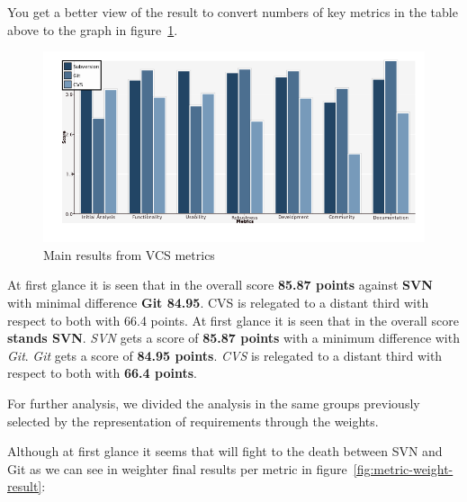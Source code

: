 \documentclass[11pt]{scrartcl}
\begin{document}
\par You get a better view of the result to convert numbers of key metrics in the table above to the graph in figure~\ref{fig:metric-result}.

\begin{figure}[H]
\begin{center}
  \includegraphics[width=1\textwidth]{libcsvanaly2/generations/metrics-vertical-chart.png}
  \caption{Main results from VCS metrics}
  \label{fig:metric-result}
\end{center}
\end{figure}

\par At first glance it is seen that in the overall score \textbf{85.87 points} against \textbf{SVN} with minimal difference \textbf{Git 84.95}. CVS is relegated to a distant third with respect to both with 66.4 points.
At first glance it is seen that in the overall score \textbf{stands SVN}. \emph{SVN} gets a score of \textbf{85.87 points} with a minimum difference with \emph{Git}. \emph{Git} gets a score of \textbf{84.95 points}. \emph{CVS} is relegated to a distant third with respect to both with \textbf{66.4 points}.

\par For further analysis, we divided the analysis in the same groups previously selected by the representation of requirements through the weights.

\par Although at first glance it seems that will fight to the death between SVN and Git as we can see in weighter final results per metric in figure~\ref{fig:metric-weight-result}:
\end{document}
